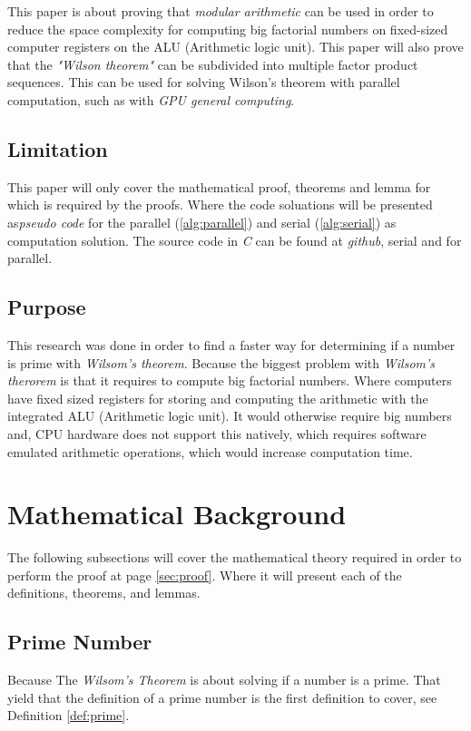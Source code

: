 \documentclass[12pt, oneside, onecolumn]{article}
\begin{document}
This paper is about proving that \emph{modular arithmetic} can be used in order to reduce the space complexity for computing big factorial numbers on fixed-sized computer registers on the ALU (Arithmetic logic unit). This paper will also prove that the \emph{"Wilson theorem"} can be subdivided into multiple factor product sequences. This can be used for solving Wilson's theorem with parallel computation, such as with \emph{GPU general computing}.


\subsection{Limitation}
This paper will only cover the mathematical proof, theorems and lemma for which is required by the proofs. Where the code soluations will be presented as\emph{pseudo code} for the parallel (\ref{alg:parallel}) and serial (\ref{alg:serial}) as computation solution. The source code in \emph{C} can be found at \emph{github}, serial\cite{wprime} and for parallel\cite{clwprime}.


\subsection{Purpose}
This research was done in order to find a faster way for determining if a number is prime with \emph{Wilsom's theorem}. Because the biggest problem with \emph{Wilsom's therorem} is that it requires to compute big factorial numbers. Where computers have fixed sized registers for storing and computing the arithmetic with the integrated ALU (Arithmetic logic unit). It would otherwise require big numbers and, CPU hardware does not support this natively, which requires software emulated arithmetic operations, which would increase computation time.

\section{Mathematical Background}
The following subsections will cover the mathematical theory required in order to perform the proof at page \ref{sec:proof}. Where it will present each of the definitions, theorems, and lemmas.

\subsection{Prime Number}
Because The \emph{Wilsom's Theorem} is about solving if a number is a prime. That yield that the definition of a prime number is the first definition to cover, see Definition \ref{def:prime}.
\end{document}
